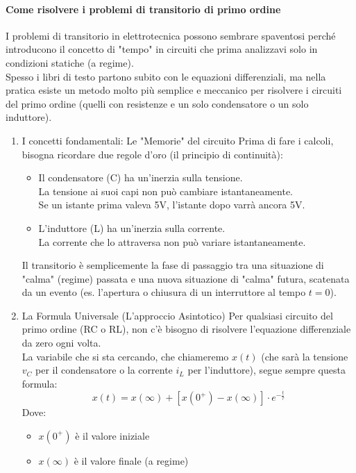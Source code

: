 \documentclass[../main.tex]{subfiles}
\begin{document}
	\paragraph{{\color{red}Come risolvere i problemi di transitorio di primo ordine}}
	I problemi di transitorio in elettrotecnica possono sembrare spaventosi perché introducono il concetto di "tempo" in circuiti che prima analizzavi solo in condizioni statiche (a regime). \\
	Spesso i libri di testo partono subito con le equazioni differenziali, ma nella pratica esiste un metodo molto più semplice e meccanico per risolvere i circuiti del primo ordine (quelli con resistenze e un solo condensatore o un solo induttore).
	
	\begin{enumerate}
		\item I concetti fondamentali: Le "Memorie" del circuito
			Prima di fare i calcoli, bisogna ricordare due regole d'oro (il principio di continuità):
			\begin{itemize}
				\item Il condensatore (C) ha un'inerzia sulla tensione. \\
				La tensione ai suoi capi non può cambiare istantaneamente. \\
				Se un istante prima valeva 5V, l'istante dopo varrà ancora 5V.
				\item L'induttore (L) ha un'inerzia sulla corrente. \\
				La corrente che lo attraversa non può variare istantaneamente.
			\end{itemize}
			Il transitorio è semplicemente la fase di passaggio tra una situazione di "calma" (regime) passata e una nuova situazione di "calma" futura, scatenata da un evento (es. l'apertura o chiusura di un interruttore al tempo $t=0$).
		\item La Formula Universale (L'approccio Asintotico)
			Per qualsiasi circuito del primo ordine (RC o RL), non c'è bisogno di risolvere l'equazione differenziale da zero ogni volta. \\
			La variabile che si sta cercando, che chiameremo $x(t)$ (che sarà la tensione $v_C$ per il condensatore o la corrente $i_L$ per l'induttore), segue sempre questa formula:
			$$\boxed{x(t) = x(\infty) + [x(0^+) - x(\infty)] \cdot e^{-\frac{t}{\tau}}}$$
			Dove:
			\begin{itemize}
				\item $x(0^+)$ è il valore iniziale
				\item $x(\infty)$ è il valore finale (a regime)

\end{itemize}
\end{enumerate}
\end{document}
